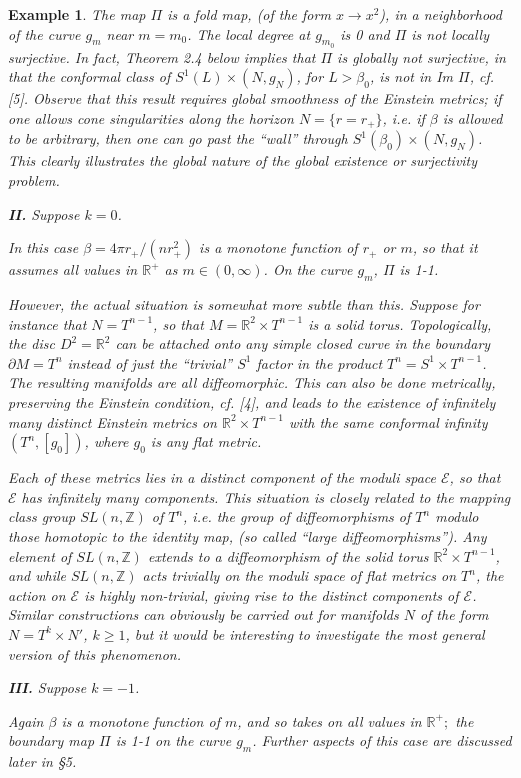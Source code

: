 \documentclass[11pt,amsfonts]{amsart}
\newtheorem{example}[theorem]{Example}
\begin{document}
\begin{example}
{ The map $\Pi$ is a fold map, (of the form $x \rightarrow  x^{2}$), in 
a neighborhood of the curve $g_{m}$ near $m = m_{0}$. The local degree 
at $g_{m_{0}}$ is 0 and $\Pi$ is not locally surjective. In fact, Theorem 2.4 
below implies that $\Pi$ is globally not surjective, in that the conformal 
class of $S^{1}(L)\times (N, g_{N})$, for $L > \beta_{0}$, is not in 
Im $\Pi$, cf. [5]. Observe that this result requires global smoothness 
of the Einstein metrics; if one allows cone singularities along the 
horizon $N = \{r = r_{+}\}$, i.e. if $\beta$ is allowed to be 
arbitrary, then one can go past the ``wall'' through 
$S^{1}(\beta_{0})\times (N, g_{N})$. This clearly illustrates the global 
nature of the global existence or surjectivity problem.

{\bf II.} Suppose $k = 0$.

 In this case $\beta  = 4\pi r_{+}/(nr_{+}^{2})$ is a monotone function 
of $r_{+}$ or $m$, so that it assumes all values in ${\mathbb R}^{+}$ as $m 
\in  (0,\infty)$. On the curve $g_{m}$, $\Pi$ is 1-1. 

 However, the actual situation is somewhat more subtle than this. 
Suppose for instance that $N = T^{n-1}$, so that $M = {\mathbb 
R}^{2}\times T^{n-1}$ is a solid torus. Topologically, the disc $D^{2} = 
{\mathbb R}^{2}$ can be attached onto {\it any} simple closed curve in the 
boundary $\partial M = T^{n}$ instead of just the ``trivial'' $S^{1}$ 
factor in the product $T^{n} = S^{1}\times T^{n-1}$. The resulting manifolds 
are all diffeomorphic. This can also be done metrically, preserving the 
Einstein condition, cf. [4], and leads to the existence of infinitely many 
distinct Einstein metrics on ${\mathbb R}^{2}\times T^{n-1}$ with the same 
conformal infinity $(T^{n}, [g_{0}])$, where $g_{0}$ is any flat metric. 

 Each of these metrics lies in a distinct component of the moduli space 
${\mathcal E}$, so that ${\mathcal E}$ has infinitely many components. This 
situation is closely related to the mapping class group $SL(n, {\mathbb Z})$ 
of $T^{n}$, i.e. the group of diffeomorphisms of $T^{n}$ modulo those 
homotopic to the identity map, (so called ``large diffeomorphisms''). 
Any element of $SL(n, {\mathbb Z})$ extends to a diffeomorphism of the 
solid torus ${\mathbb R}^{2}\times T^{n-1}$, and while $SL(n, {\mathbb Z})$ 
acts trivially on the moduli space of flat metrics on $T^{n}$, the action 
on ${\mathcal E}$ is highly non-trivial, giving rise to the distinct 
components of ${\mathcal E}$. Similar constructions can obviously 
be carried out for manifolds $N$ of the form $N = T^{k}\times N'$, $k \geq 1$, 
but it would be interesting to investigate the most general version of this 
phenomenon.

{\bf III.}  Suppose $k = -1$. 

 Again $\beta$ is a monotone function of $m$, and so takes on all values 
in ${\mathbb R}^{+};$ the boundary map $\Pi$ is 1-1 on the curve $g_{m}$. 
Further aspects of this case are discussed later in \S 5. }
\end{example}
\end{document}
